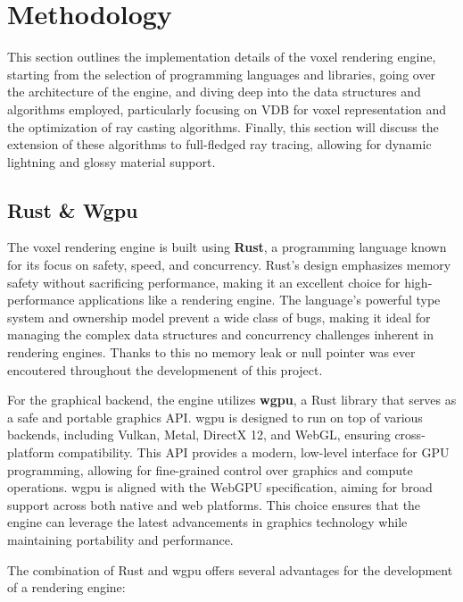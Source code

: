 
\section{Methodology}
This section outlines the implementation details of the voxel rendering engine, starting from the selection of programming languages and libraries, going over the architecture of the engine, and diving deep into the data structures and algorithms employed, particularly focusing on VDB for voxel representation and the optimization of ray casting algorithms.
Finally, this section will discuss the extension of these algorithms to full-fledged ray tracing, allowing for dynamic lightning and glossy material support.

\subsection{Rust \& Wgpu}

The voxel rendering engine is built using \textbf{Rust}, a programming language known for its focus on safety, speed, and concurrency\supercite{rustbook}.
Rust's design emphasizes memory safety without sacrificing performance, making it an excellent choice for high-performance applications like a rendering engine.
The language's powerful type system and ownership model prevent a wide class of bugs, making it ideal for managing the complex data structures and concurrency challenges inherent in rendering engines. Thanks to this no memory leak or null pointer was ever encoutered throughout the developmenent of this project.

For the graphical backend, the engine utilizes \textbf{wgpu}\supercite{wgpu}, a Rust library that serves as a safe and portable graphics API. wgpu is designed to run on top of various backends, including Vulkan, Metal, DirectX 12, and WebGL, ensuring cross-platform compatibility. This API provides a modern, low-level interface for GPU programming, allowing for fine-grained control over graphics and compute operations. wgpu is aligned with the WebGPU specification\supercite{webgpu:doc}, aiming for broad support across both native and web platforms.
This choice ensures that the engine can leverage the latest advancements in graphics technology while maintaining portability and performance.

The combination of Rust and wgpu offers several advantages for the development of a rendering engine:

